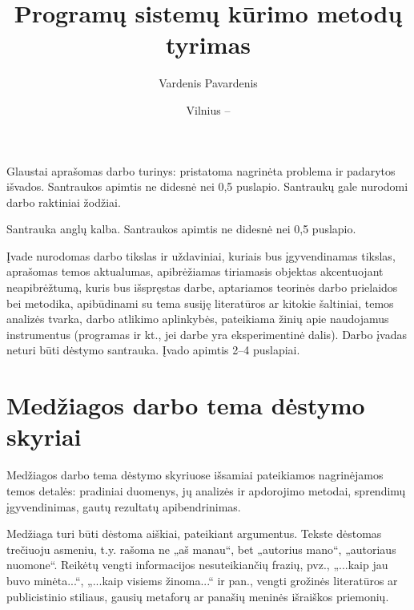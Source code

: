 \documentclass{VUMIFPSbakalaurinis}
\title{Programų sistemų kūrimo metodų tyrimas}
\author{Vardenis Pavardenis}
\date{Vilnius – \the\year}
\begin{document}
    \maketitle
    
    
    Glaustai aprašomas darbo turinys: pristatoma nagrinėta problema ir padarytos
    išvados. Santraukos apimtis ne didesnė nei 0,5 puslapio. Santraukų gale
    nurodomi darbo raktiniai žodžiai. 
    
    Santrauka anglų kalba. Santraukos apimtis ne didesnė nei 0,5 puslapio.
    
    \tableofcontents
    
    Įvade nurodomas darbo tikslas ir uždaviniai, kuriais bus įgyvendinamas tikslas,
    aprašomas temos aktualumas, apibrėžiamas tiriamasis objektas akcentuojant
    neapibrėžtumą, kuris bus išspręstas darbe, aptariamos teorinės darbo prielaidos
    bei metodika, apibūdinami su tema susiję literatūros ar kitokie šaltiniai,
    temos analizės tvarka, darbo atlikimo aplinkybės, pateikiama žinių apie
    naudojamus instrumentus (programas ir kt., jei darbe yra eksperimentinė dalis).
    Darbo įvadas neturi būti dėstymo santrauka. Įvado apimtis 2–4 puslapiai.
    
    \section{Medžiagos darbo tema dėstymo skyriai}
    Medžiagos darbo tema dėstymo skyriuose išsamiai pateikiamos nagrinėjamos temos
    detalės: pradiniai duomenys, jų analizės ir apdorojimo metodai, sprendimų
    įgyvendinimas, gautų rezultatų apibendrinimas.
    
    Medžiaga turi būti dėstoma aiškiai, pateikiant argumentus. Tekste dėstomas
    trečiuoju asmeniu, t.y. rašoma ne „aš manau“, bet „autorius mano“, „autoriaus
    nuomone“. Reikėtų vengti informacijos nesuteikiančių frazių, pvz., „...kaip jau
    buvo minėta...“, „...kaip visiems žinoma...“ ir pan., vengti grožinės
    literatūros ar publicistinio stiliaus, gausių metaforų ar panašių meninės
    išraiškos priemonių.
    
\end{document}
